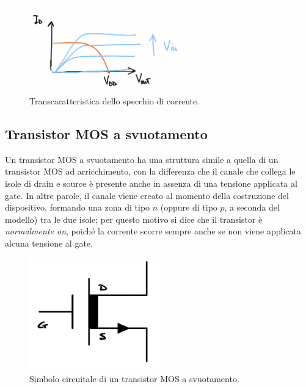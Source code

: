 \begin{figure}[H]
    \centering
    \includegraphics[width=0.6\textwidth]{images/1.4.1.2.png}
    \caption{Transcaratteristica dello specchio di corrente.}
    \label{fig:specchio_corrente_tc}
\end{figure}

\newpage

\subsection{Transistor MOS a svuotamento}
Un transistor MOS a svuotamento ha una struttura simile a quella di un transistor MOS ad arricchimento, con la differenza che il canale che collega le isole di drain e source è presente anche in assenza di una tensione applicata al gate. In altre parole, il canale viene creato al momento della costruzione del dispositivo, formando una zona di tipo \(n\) (oppure di tipo \(p\), a seconda del modello) tra le due isole; per questo motivo si dice che il transistor è \emph{normalmente on}, poiché la corrente scorre sempre anche se non viene applicata alcuna tensione al gate.
\begin{figure}[H]
  \centering
  \includegraphics[width=0.5\textwidth]{images/1.4.2.2.png}
  \caption{Simbolo circuitale di un transistor MOS a svuotamento.}
  \label{fig:mos_depletion_symbol}
\end{figure}
